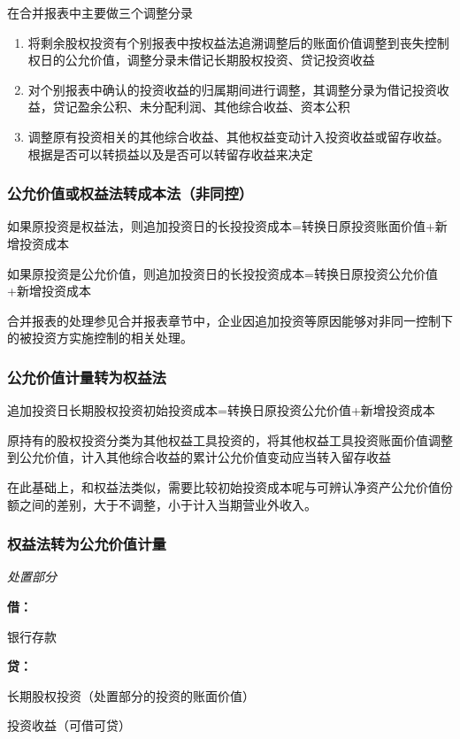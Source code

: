 \documentclass[UTF8,12pt]{ctexart}
\newenvironment{Dr}{%
	\begin{list}{}%
		{
			\setlength{\leftmargin}{2em}
			\setlength{\labelwidth}{2em}
			\setlength{\labelsep}{0pt}
			\setlength{\itemindent}{0pt}
			\setlength{\listparindent}{0pt}
			\setlength{\parsep}{0pt}
			\setlength{\topsep}{0pt}
		}
		\item[\textbf{借：}]
	}{%
	\end{list}
}
\newenvironment{Cr}{%
	\begin{list}{}%
		{
			\setlength{\leftmargin}{2em}
			\setlength{\labelwidth}{2em}
			\setlength{\labelsep}{0pt}
			\setlength{\itemindent}{0pt}
			\setlength{\listparindent}{0pt}
			\setlength{\parsep}{0pt}
			\setlength{\topsep}{0pt}
		}
		\item[\textbf{贷：}]
	}{%
	\end{list}
}
\numberwithin{equation}{section} %
\numberwithin{figure}{section}
\numberwithin{table}{section}
\begin{document}
	在合并报表中主要做三个调整分录
	\begin{enumerate}
		\item 将剩余股权投资有个别报表中按权益法追溯调整后的账面价值调整到丧失控制权日的公允价值，调整分录未借记长期股权投资、贷记投资收益
		
		\item 对个别报表中确认的投资收益的归属期间进行调整，其调整分录为借记投资收益，贷记盈余公积、未分配利润、其他综合收益、资本公积
		
		\item 调整原有投资相关的其他综合收益、其他权益变动计入投资收益或留存收益。根据是否可以转损益以及是否可以转留存收益来决定
	\end{enumerate}
	
	\subsubsection{公允价值或权益法转成本法（非同控）}
	如果原投资是权益法，则追加投资日的长投投资成本=转换日原投资账面价值+新增投资成本
	
	如果原投资是公允价值，则追加投资日的长投投资成本=转换日原投资公允价值+新增投资成本
	
	合并报表的处理参见合并报表章节中，企业因追加投资等原因能够对非同一控制下的被投资方实施控制的相关处理。
	
	\subsubsection{公允价值计量转为权益法}
	
	追加投资日长期股权投资初始投资成本=转换日原投资公允价值+新增投资成本
	
	原持有的股权投资分类为其他权益工具投资的，将其他权益工具投资账面价值调整到公允价值，计入其他综合收益的累计公允价值变动应当转入留存收益
	
	在此基础上，和权益法类似，需要比较初始投资成本呢与可辨认净资产公允价值份额之间的差别，大于不调整，小于计入当期营业外收入。
	
	\subsubsection{权益法转为公允价值计量}
	\textit{处置部分}
	
	\begin{Dr}
		银行存款
	\end{Dr}
	\begin{Cr}
		长期股权投资（处置部分的投资的账面价值）
		
		投资收益（可借可贷）
	\end{Cr}
	
\end{document}
